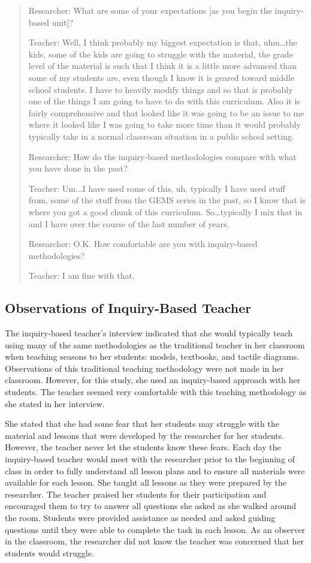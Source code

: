 \documentclass[11.5pt]{sig-alternate} %
\begin{document}
\begin{large}
\begin{quote}
Researcher: What are some of your expectations [as you begin the inquiry-based unit]?

Teacher:  Well, I think probably my biggest expectation is that, uhm…the kids, some of the kids are going to struggle with the material, the grade level of the material is such that I think it is a little more advanced than some of my students are, even though I know it is geared toward middle school students.  I have to heavily modify things and so that is probably one of the things I am going to have to do with this curriculum. Also it is fairly comprehensive and that looked like it was going to be an issue to me where it looked like I was going to take more time than it would probably typically take in a normal classroom situation in a public school setting.
 
Researcher: How do the inquiry-based methodologies compare with what you have done in the past?

Teacher:  Um...I have used some of this, uh, typically I have used stuff from, some of the stuff from the GEMS series in the past, so I know that is where you got a good chunk of this curriculum.  So…typically I mix that in and I have over the course of the last number of years.

Researcher:  O.K. How comfortable are you with inquiry-based methodologies?

Teacher:  I am fine with that.
\end{quote}

\subsection*{Observations of Inquiry-Based Teacher}
 
The inquiry-based teacher’s interview indicated that she would typically teach using many of the same methodologies as the traditional teacher in her classroom when teaching seasons to her students: models, textbooks, and tactile diagrams. Observations of this traditional teaching methodology were not made in her classroom. However, for this study, she used an inquiry-based approach with her students. The teacher seemed very comfortable with this teaching methodology as she stated in her interview.  

She stated that she had some fear that her students may struggle with the material and lessons that were developed by the researcher for her students. However, the teacher never let the students know these fears. Each day the inquiry-based teacher would meet with the researcher prior to the beginning of class in order to fully understand all lesson plans and to ensure all materials were available for each lesson.  She taught all lessons as they were prepared by the researcher.  The teacher praised her students for their participation and encouraged them to try to answer all questions she asked as she walked around the room.  Students were provided assistance as needed and asked guiding questions until they were able to complete the task in each lesson.  As an observer in the classroom, the researcher did not know the teacher was concerned that her students would struggle. 


\end{large}
\end{document}
